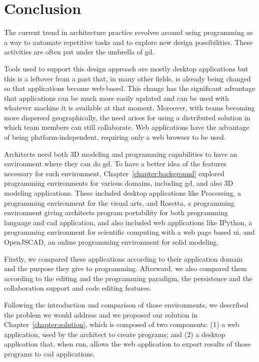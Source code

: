 
\chapter{Conclusion}
\label{chapter:conclusion}
The current trend in architecture practice revolves around using programming as a way to automate repetitive tasks and to explore new design possibilities.
These activities are often put under the umbrella of \acrfull{gd}.

Tools used to support this design approach are mostly desktop applications but this is a leftover from a past that, in many other fields, is already being changed so that applications become web-based.
This change has the significant advantage that applications can be much more easily updated and can be used with whatever machine it is available at that moment.
Moreover, with teams becoming more dispersed geographically, the need arises for using a distributed solution in which team members can still collaborate.
Web applications have the advantage of being platform-independent, requiring only a web browser to be used.

Architects need both 3D modeling and programming capabilities to have an environment where they can do \gls{gd}.
To have a better idea of the features necessary for such environment, Chapter~\ref{chapter:background} explored programming environments for various domains, including \gls{gd}, and also 3D modeling applications.
These included desktop applications like Processing, a programming environment for the visual arts, and Rosetta, a programming environment giving architects program portability for both programming language and \gls{cad} application, and also included web applications like IPython, a programming environment for scientific computing with a web page based \gls{ui}, and OpenJSCAD, an online programming environment for solid modeling.

Firstly, we compared these applications according to their application domain and the purpose they give to programming.
Afterward, we also compared them according to the editing and the programming paradigm, the persistence and the collaboration support and code editing features.

Following the introduction and comparison of those environments, we described the problem we would address and we proposed our solution in Chapter~\ref{chapter:solution}, which is composed of two components:
(1) a web application, used by the architect to create programs;
and (2) a desktop application that, when run, allows the web application to export results of those programs to \gls{cad} applications.


